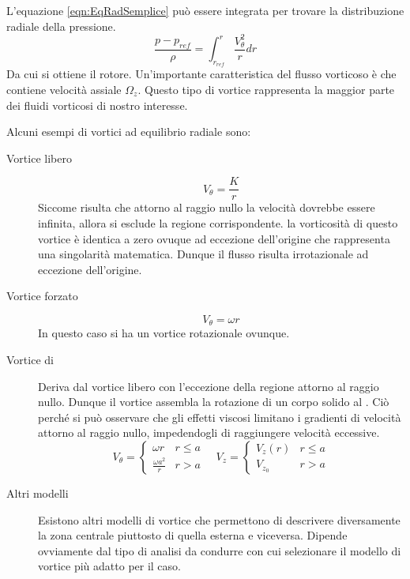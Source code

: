 L'equazione \eqref{eqn:EqRadSemplice} può essere integrata per trovare la distribuzione radiale della pressione.
\begin{equation}
\frac{p - p _{ref}}{\rho} = \int_{r_{ref}}^r{\frac{V^2_{\theta}}{r} dr}
\end{equation}
Da cui si ottiene il rotore.
Un'importante caratteristica del flusso vorticoso è che contiene velocità assiale $\Omega_z$. Questo tipo di vortice rappresenta la maggior parte dei fluidi vorticosi di nostro interesse.

Alcuni esempi di vortici ad equilibrio radiale sono:
\begin{description}
\item[Vortice libero] 
\begin{equation}
V_{\theta} = \frac{K}{r}
\end{equation}
Siccome risulta che attorno al raggio nullo la velocità dovrebbe essere infinita, allora si esclude la regione corrispondente.
la vorticosità di questo vortice è identica a zero ovuque ad eccezione dell'origine che rappresenta una singolarità matematica.
Dunque il flusso risulta irrotazionale ad eccezione dell'origine.
\item[Vortice forzato]
\begin{equation}
V_{\theta} = \omega r
\end{equation}
In questo caso si ha un vortice rotazionale ovunque.
\item[Vortice di ]
Deriva dal vortice libero con l'eccezione della regione attorno al raggio nullo.
Dunque il vortice  assembla la rotazione di un corpo solido al .
Ciò perché si può osservare che gli effetti viscosi limitano i gradienti di velocità attorno al raggio nullo, impedendogli di raggiungere velocità eccessive.
\begin{equation}
V_{\theta} =%
\begin{cases}
\omega r & r \leq a\\
\frac{\omega a^2}{r} & r > a
\end{cases} \quad
V_z = %
\begin{cases}
V_z(r) & r\leq a\\
V_{z_0} & r > a
\end{cases}
\end{equation}
\item[Altri modelli] Esistono altri modelli di vortice che permettono di descrivere diversamente la zona centrale piuttosto di quella esterna e viceversa. Dipende ovviamente dal tipo di analisi da condurre con cui selezionare il modello di vortice più adatto per il caso.
\end{description}

